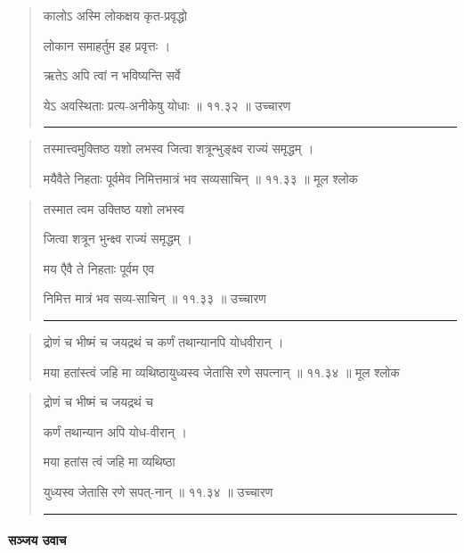\begin{quotation}

कालोऽ अस्मि लोकक्षय कृत-प्रवृद्धो 

लोकान समाहर्तुम इह प्रवृत्तः  ।  

ऋतेऽ अपि त्वां न भविष्यन्ति सर्वे 

येऽ अवस्थिताः प्रत्य-अनीकेषु योधाः  ॥ ११.३२ ॥  उच्चारण

\noindent\rule{16cm}{0.4pt} 
\end{quotation}


\begin{quotation} 

तस्मात्त्वमुक्तिष्ठ यशो लभस्व जित्वा शत्रून्भुङ्‍क्ष्व राज्यं समृद्धम्‌  ।  

मयैवैते निहताः पूर्वमेव निमित्तमात्रं भव सव्यसाचिन्‌  ॥ ११.३३ ॥  मूल श्लोक
\end{quotation}

\begin{quotation}

तस्मात त्वम उक्तिष्ठ यशो लभस्व

जित्वा शत्रून भुन्क्ष्व राज्यं समृद्धम्‌  ।  

मय एैवै ते निहताः पूर्वम एव 

निमित्त मात्रं भव सव्य-साचिन्‌  ॥ ११.३३ ॥  उच्चारण

\noindent\rule{16cm}{0.4pt} 
\end{quotation}


\begin{quotation} 

द्रोणं च भीष्मं च जयद्रथं च कर्णं तथान्यानपि योधवीरान्‌  ।  

मया हतांस्त्वं जहि मा व्यथिष्ठायुध्यस्व जेतासि रणे सपत्नान्‌  ॥ ११.३४ ॥  मूल श्लोक
\end{quotation}

\begin{quotation}

द्रोणं च भीष्मं च जयद्रथं च 

कर्णं तथान्यान अपि योध-वीरान्‌  ।  

मया हतांस त्वं जहि मा व्यथिष्ठा 

युध्यस्व जेतासि रणे सपत्-नान्‌  ॥ ११.३४ ॥  उच्चारण

\noindent\rule{16cm}{0.4pt} 
\end{quotation}


\paragraph{\sanskrit सञ्जय उवाच}

